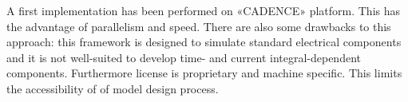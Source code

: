 A first implementation has been performed on «CADENCE» platform.  This
has the advantage of parallelism and speed.  There are also some
drawbacks to this approach: this framework is designed to simulate
standard electrical components and it is not well-suited to develop
time- and current integral-dependent components.  Furthermore license
is proprietary and machine specific.  This limits the accessibility of
of model design process.


